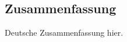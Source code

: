 \endgroup

\cleardoublepage%

\begingroup
\let\clearpage\relax
\let\cleardoublepage\relax
\let\cleardoublepage\relax

\begin{otherlanguage}{ngerman}
\chapter*{Zusammenfassung}

Deutsche Zusammenfassung hier.

\end{otherlanguage}

\endgroup

\vfill










